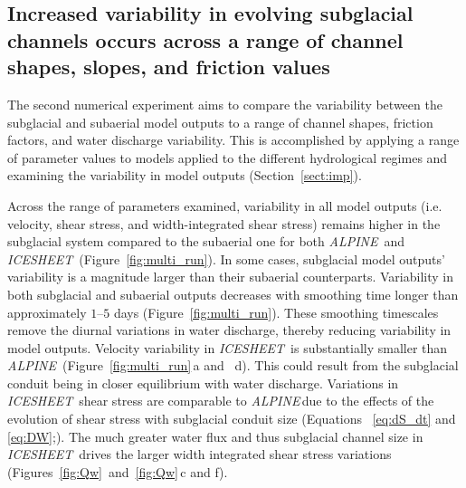 \documentclass[tc, manuscript]{copernicus}
\newcommand{\alpine}{\textit{ALPINE}\,}
\newcommand{\icesheet}{\textit{ICESHEET}\,}
\begin{document}
\FloatBarrier
\subsection{Increased variability in evolving subglacial channels occurs across a range of channel shapes, slopes,  and friction values}
\label{sect:ensemble}

The second numerical experiment aims to compare the variability between the subglacial and subaerial model outputs to a range of channel shapes, friction factors, and water discharge variability. 
This is accomplished by applying a range of parameter values to models applied to the different hydrological regimes and examining the variability in model outputs (Section~\ref{sect:imp}).

Across the range of parameters examined, variability in all model outputs (i.e. velocity, shear stress, and width-integrated shear stress) remains higher in the subglacial system compared to the subaerial one for both \alpine{} and \icesheet{} (Figure~\ref{fig:multi_run}).
In some cases, subglacial model outputs' variability is a magnitude larger than their subaerial counterparts.
Variability in both subglacial and subaerial outputs decreases with smoothing time longer than approximately $1$--$5$ days (Figure~\ref{fig:multi_run}).
These smoothing timescales remove the diurnal variations in water discharge, thereby reducing variability in model outputs. 
Velocity variability in \icesheet{} is substantially smaller than \alpine{} (Figure~\ref{fig:multi_run}\,a and \, d).
This could result from the subglacial conduit being in closer equilibrium with water discharge.
Variations in \icesheet{} shear stress are comparable to \alpine due to the effects of the evolution of shear stress with subglacial conduit size (Equations ~\ref{eq:dS_dt} and \ref{eq:DW};). 
The much greater water flux and thus subglacial channel size in \icesheet{} drives the larger width integrated shear stress variations (Figures~\ref{fig:Qw}~and~\ref{fig:Qw}\,c and f).
\end{document}
